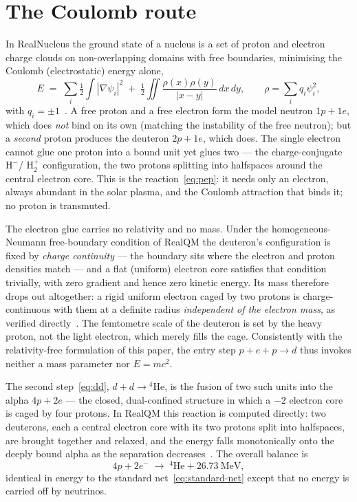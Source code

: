 \documentclass[11pt]{article}
\begin{document}
\section{The Coulomb route}

In RealNucleus the ground state of a nucleus is a set of proton and electron charge clouds on
non-overlapping domains with free boundaries, minimising the Coulomb (electrostatic) energy alone,
\begin{equation}
E \;=\; \sum_i \tfrac{1}{2}\!\int|\nabla\psi_i|^2
\;+\; \tfrac12\!\iint\frac{\rho(x)\rho(y)}{|x-y|}\,dx\,dy, \qquad \rho=\sum_i q_i\psi_i^2 ,
\label{eq:energy}
\end{equation}
with $q_i=\pm1$~\cite{Johnson-RealQM,Johnson-RealNucleus}. A free proton and a free electron form the
model neutron $1p+1e$, which does \emph{not} bind on its own (matching the instability of the free
neutron); but a \emph{second} proton produces the deuteron $2p+1e$, which does. The single electron
cannot glue one proton into a bound unit yet glues two --- the charge-conjugate $\mathrm{H}^-$/
$\mathrm{H}_2^{+}$ configuration, the two protons splitting into halfspaces around the central electron
core. This is the reaction~\eqref{eq:pep}: it needs only an electron, always abundant in the solar
plasma, and the Coulomb attraction that binds it; no proton is transmuted.

The electron glue carries no relativity and no mass. Under the homogeneous-Neumann free-boundary
condition of RealQM the deuteron's configuration is fixed by \emph{charge continuity} --- the boundary
sits where the electron and proton densities match --- and a flat (uniform) electron core satisfies that
condition trivially, with zero gradient and hence zero kinetic energy. Its mass therefore drops out
altogether: a rigid uniform electron caged by two protons is charge-continuous with them at a definite
radius \emph{independent of the electron mass}, as verified directly~\cite{Johnson-RealNucleus}. The
femtometre scale of the deuteron is set by the heavy proton, not the light electron, which merely fills
the cage. Consistently with the relativity-free formulation of this paper, the entry step $p+e+p\to d$
thus invokes neither a mass parameter nor $E=mc^2$.

The second step~\eqref{eq:dd}, $d+d\to{}^4\mathrm{He}$, is the fusion of two such units into the alpha
$4p+2e$ --- the closed, dual-confined structure in which a $-2$ electron core is caged by four
protons. In RealQM this reaction is computed directly: two deuterons, each a central electron core
with its two protons split into halfspaces, are brought together and relaxed, and the energy falls
monotonically onto the deeply bound alpha as the separation decreases~\cite{Johnson-RealNucleus}. The
overall balance is
\begin{equation}
4p + 2e^- \;\longrightarrow\; {}^4\mathrm{He} + 26.73~\text{MeV},
\label{eq:coulomb-net}
\end{equation}
identical in energy to the standard net~\eqref{eq:standard-net} except that no energy is carried off by
neutrinos.
\end{document}

